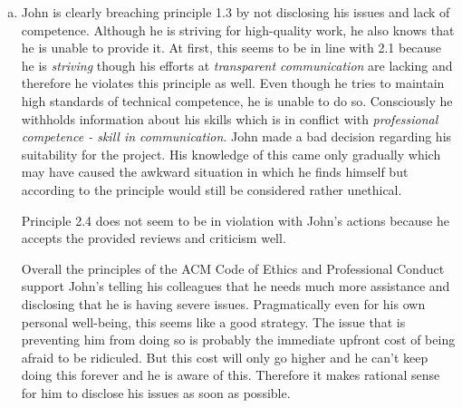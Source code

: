 \documentclass[a4paper, 11pt]{article}
\begin{document}
\begin{enumerate}[(a)]
    \item
    John is clearly breaching principle 1.3 by not disclosing his issues and lack of competence.
    Although he is striving for high-quality work, he also knows that he is unable to provide it. At first, this seems to be in line with 2.1 because he is \emph{striving} though his efforts at \emph{transparent communication} are lacking and therefore he violates this principle as well.
    Even though he tries to maintain high standards of technical competence, he is unable to do so. Consciously he withholds information about his skills which is in conflict with \emph{professional competence - skill in communication}.
    John made a bad decision regarding his suitability for the project. His knowledge of this came only gradually which may have caused the awkward situation in which he finds himself but according to the principle would still be considered rather unethical.
    
    Principle 2.4 does not seem to be in violation with John's actions because he accepts the provided reviews and criticism well.
    
    Overall the principles of the ACM Code of Ethics and Professional Conduct support John's telling his colleagues that he needs much more assistance and disclosing that he is having severe issues.
    Pragmatically even for his own personal well-being, this seems like a good strategy.
    The issue that is preventing him from doing so is probably the immediate upfront cost of being afraid to be ridiculed.
    But this cost will only go higher and he can't keep doing this forever and he is aware of this.
    Therefore it makes rational sense for him to disclose his issues as soon as possible.
\end{enumerate}


\end{document}
